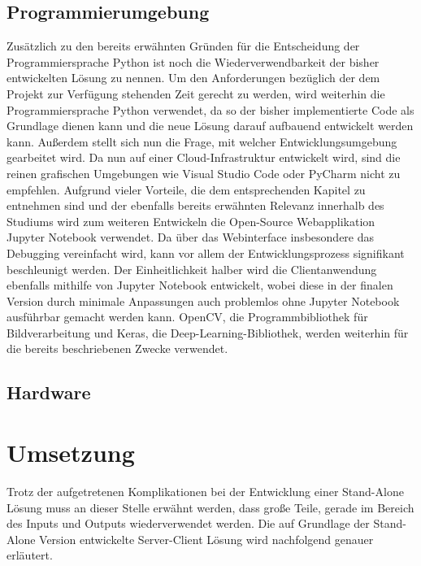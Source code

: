 \documentclass[12pt, a4paper]{scrbook}
\begin{document}
\subsection{Programmierumgebung}
Zusätzlich zu den bereits erwähnten Gründen für die Entscheidung der Programmiersprache Python ist noch die Wiederverwendbarkeit der bisher entwickelten Lösung zu nennen. Um den Anforderungen bezüglich der dem Projekt zur Verfügung stehenden Zeit gerecht zu werden, wird weiterhin die Programmiersprache Python verwendet, da so der bisher implementierte Code als Grundlage dienen kann und die neue Lösung darauf aufbauend entwickelt werden kann.
Außerdem stellt sich nun die Frage, mit welcher Entwicklungsumgebung gearbeitet wird. Da nun auf einer Cloud-Infrastruktur entwickelt wird, sind die reinen grafischen Umgebungen wie Visual Studio Code oder PyCharm nicht zu empfehlen. Aufgrund vieler Vorteile, die dem entsprechenden Kapitel zu entnehmen sind und der ebenfalls bereits erwähnten Relevanz innerhalb des Studiums wird zum weiteren Entwickeln die Open-Source Webapplikation Jupyter Notebook verwendet. Da über das Webinterface insbesondere das Debugging vereinfacht wird, kann vor allem der Entwicklungsprozess signifikant beschleunigt werden. Der Einheitlichkeit halber wird die Clientanwendung ebenfalls mithilfe von Jupyter Notebook entwickelt, wobei diese in der finalen Version durch minimale Anpassungen auch problemlos ohne Jupyter Notebook ausführbar gemacht werden kann. OpenCV, die Programmbibliothek für Bildverarbeitung und Keras, die Deep-Learning-Bibliothek, werden weiterhin für die bereits beschriebenen Zwecke verwendet.

\subsection{Hardware}


\section{Umsetzung}
Trotz der aufgetretenen Komplikationen bei der Entwicklung einer Stand-Alone Lösung muss an dieser Stelle erwähnt werden, dass große Teile, gerade im Bereich des Inputs und Outputs wiederverwendet werden. Die auf Grundlage der Stand-Alone Version entwickelte Server-Client Lösung wird nachfolgend genauer erläutert.
\end{document}
